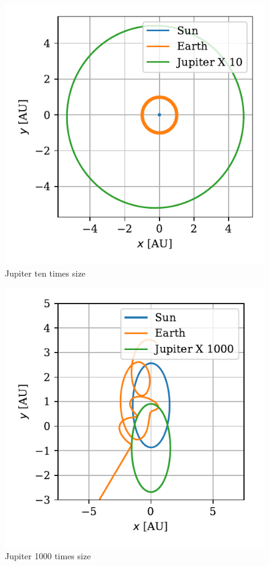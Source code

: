\documentclass[twocolumn]{aastex62}
\begin{document}
\begin{figure}
\includegraphics[scale=1]{Figures/jupiter10.pdf}
\caption{Jupiter ten times size}
\label{fig:jupiter10}
\end{figure}

\begin{figure}
\includegraphics[scale=1]{Figures/jupiter1000.pdf}
\caption{Jupiter 1000 times size}
\label{fig:jupiter1000}
\end{figure}
\end{document}
